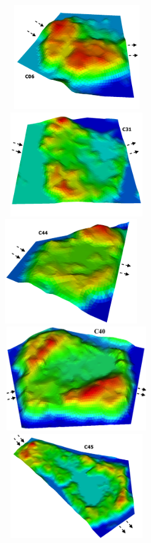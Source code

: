 \documentclass[review,11pt]{elsarticle}
\begin{document}
\begin{figure}[!h]
\centering
\vskip -1cm
\includegraphics[width=6.2cm, height=4.5cm]{./figures/polygons-finescale/3Dpolygon06-3B.png}
\includegraphics[width=6.2cm, height=4.5cm]{./figures/polygons-finescale/3Dpolygon31-3B.png}\\
\includegraphics[width=6.cm, height=4.5cm]{./figures/polygons-finescale/3Dpolygon44-3B.png}
\includegraphics[width=6.2cm, height=4.5cm]{./figures/polygons-finescale/3Dpolygon40-1.png} \\
 \includegraphics[width=6.2cm, height=4.5cm]{./figures/polygons-finescale/3Dpolygon45-3B.png}

\end{figure}
\end{document}
